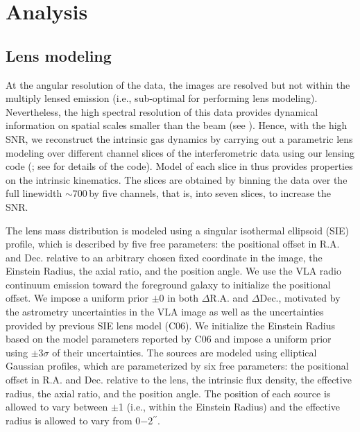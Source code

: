 \documentclass[]{emulateapj}
\begin{document}


\section{Analysis}
\subsection{Lens modeling} \label{sec:lensmodel} %
At the angular resolution of the \bco data, the images are resolved
but not within the multiply lensed emission (i.e., sub-optimal for
performing lens modeling). Nevertheless, the high spectral
resolution of this data provides dynamical information on
spatial scales smaller than the beam (see ).
Hence, with the high SNR, we reconstruct the intrinsic gas
dynamics by carrying out a parametric lens modeling over different
channel slices of the interferometric data using our lensing code
\uvmcmcfit (\citealt{uvmcmcfit15a}; see \citealt{Bussmann15a} for details of
the code). Model of each slice in  thus provides
properties on the intrinsic kinematics. The slices
are obtained by binning the data over the full linewidth
$\sim$700\,\kms by five channels,
that is, into seven slices, to increase the SNR.

The lens mass distribution is modeled using a singular isothermal
ellipsoid (SIE) profile, which is described by five free parameters: the
positional offset in R.A. and Dec. relative to an arbitrary chosen
fixed coordinate in the image, the Einstein Radius, the axial ratio, and the
position angle. We use the VLA radio continuum emission toward
the foreground galaxy to initialize the positional offset. We impose a
uniform prior $\pm$0 in both $\Delta$R.A. and $\Delta$Dec.,
motivated by the astrometry uncertainties in the VLA image as well as
the uncertainties provided by previous SIE lens model (C06).
We initialize the Einstein Radius based on the model parameters reported by C06
and impose a uniform prior using $\pm$3$\sigma$ of their uncertainties.
The sources are modeled using elliptical Gaussian profiles, which are
parameterized by six free parameters: the positional offset in R.A.
and Dec. relative to the lens, the intrinsic flux density, the effective
radius, the axial ratio, and the position angle. The position of each source
is allowed to vary between $\pm$1 (i.e., within the Einstein Radius)
and the effective radius is allowed to vary from 0$-$2$^{\prime\prime}$.
\end{document}
